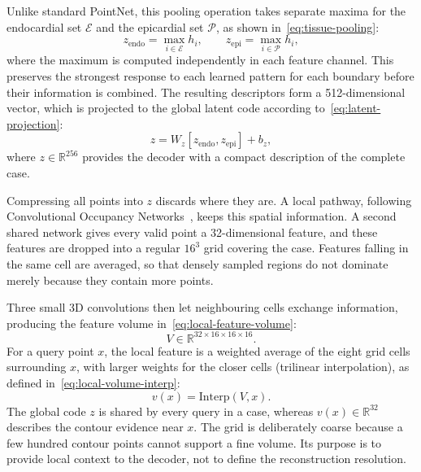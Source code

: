 Unlike standard PointNet, this pooling operation takes separate maxima for the
endocardial set $\mathcal{E}$ and the epicardial set $\mathcal{P}$, as shown in~\cref{eq:tissue-pooling}:
\begin{equation}
	z_{\mathrm{endo}} = \max_{i \in \mathcal{E}} h_i,
	\qquad
	z_{\mathrm{epi}} = \max_{i \in \mathcal{P}} h_i,
	\label{eq:tissue-pooling}
\end{equation}
where the maximum is computed independently in each feature channel. This
preserves the strongest response to each learned pattern for each boundary
before their information is combined. The resulting descriptors form a
512-dimensional vector, which is projected to the global latent code according
to~\cref{eq:latent-projection}:
\begin{equation}
	z = W_z [z_{\mathrm{endo}}, z_{\mathrm{epi}}] + b_z,
	\label{eq:latent-projection}
\end{equation}
where $z\in\mathbb{R}^{256}$ provides the decoder with a compact description
of the complete case.

Compressing all points into $z$ discards where they are. A local pathway,
following Convolutional Occupancy Networks~\parencite{peng2020convonet},
keeps this spatial information. A second shared network gives every valid
point a 32-dimensional feature, and these features are dropped into a
regular $16^3$ grid covering the case. Features falling in the same cell are
averaged, so that densely sampled regions do not dominate merely because they
contain more points.

Three small 3D convolutions then let neighbouring cells exchange
information, producing the feature volume in~\cref{eq:local-feature-volume}:
\begin{equation}
	V \in \mathbb{R}^{32\times16\times16\times16}.
	\label{eq:local-feature-volume}
\end{equation}
For a query point $x$, the local feature is a weighted average of the eight
grid cells surrounding $x$, with larger weights for the closer cells
(trilinear interpolation), as defined in~\cref{eq:local-volume-interp}:
\begin{equation}
	v(x) = \mathrm{Interp}(V, x).
	\label{eq:local-volume-interp}
\end{equation}
The global code $z$ is shared by every query in a case, whereas
$v(x)\in\mathbb{R}^{32}$ describes the contour evidence near $x$. The grid is
deliberately coarse because a few hundred contour points cannot support a fine
volume. Its purpose is to provide local context to the decoder, not to define
the reconstruction resolution.

